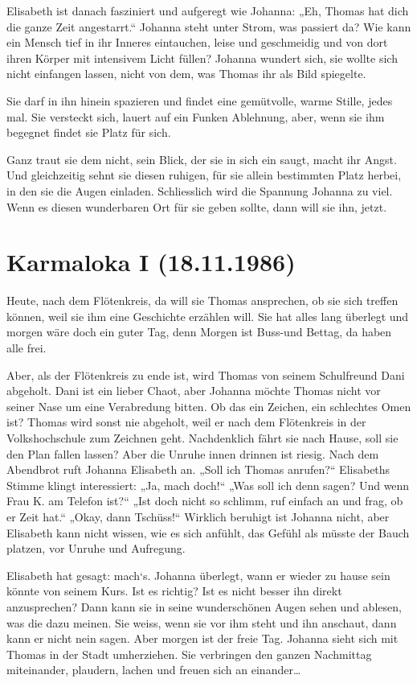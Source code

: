 \documentclass[10pt,titlepage,a5paper]{book}
\begin{document}
Elisabeth ist danach fasziniert und aufgeregt wie Johanna: „Eh, Thomas hat dich die ganze Zeit angestarrt.“ Johanna steht unter Strom, was passiert da? Wie kann ein Mensch tief in ihr Inneres eintauchen, leise und geschmeidig und von dort ihren Körper mit intensivem Licht füllen? Johanna wundert sich, sie wollte sich nicht einfangen lassen, nicht von dem, was Thomas ihr als Bild spiegelte. 

Sie darf in ihn hinein spazieren und findet eine gemütvolle, warme Stille, jedes mal. Sie versteckt sich, lauert auf ein Funken Ablehnung, aber, wenn sie ihm begegnet findet sie Platz für sich. 

Ganz traut sie dem nicht, sein Blick, der sie in sich ein saugt, macht ihr Angst. Und gleichzeitig sehnt sie diesen ruhigen, für sie allein bestimmten Platz herbei, in den sie die Augen einladen. Schliesslich wird die Spannung Johanna zu viel. Wenn es diesen wunderbaren Ort für sie geben sollte, dann will sie ihn, jetzt.


\section*{Karmaloka I (18.11.1986)}


Heute, nach dem Flötenkreis, da will sie Thomas ansprechen, ob sie sich treffen können, weil sie ihm eine Geschichte erzählen will. Sie hat alles lang überlegt und morgen wäre doch ein guter Tag, denn Morgen ist Buss-und Bettag, da haben alle frei.

Aber, als der Flötenkreis zu ende ist, wird Thomas von seinem Schulfreund Dani abgeholt. Dani ist ein lieber Chaot, aber Johanna möchte Thomas nicht vor seiner Nase um eine Verabredung bitten. Ob das ein Zeichen, ein schlechtes Omen ist? Thomas wird sonst nie abgeholt, weil er nach dem Flötenkreis in der Volkshochschule zum Zeichnen geht. Nachdenklich fährt sie nach Hause, soll sie den Plan fallen lassen? Aber die Unruhe innen drinnen ist riesig. Nach dem Abendbrot ruft Johanna Elisabeth an. „Soll ich Thomas anrufen?“ Elisabeths Stimme klingt interessiert: „Ja, mach doch!“ „Was soll ich denn sagen? Und wenn Frau K. am Telefon ist?“ „Ist doch nicht so schlimm, ruf einfach an und frag, ob er Zeit hat.“ „Okay, dann Tschüss!“ Wirklich beruhigt ist Johanna nicht, aber Elisabeth kann nicht wissen, wie es sich anfühlt, das Gefühl als müsste der Bauch platzen, vor Unruhe und Aufregung.

Elisabeth hat gesagt: mach`s. Johanna überlegt, wann er wieder zu hause sein könnte von seinem Kurs. Ist es richtig? Ist es nicht besser ihn direkt anzusprechen? Dann kann sie in seine wunderschönen Augen sehen und ablesen, was die dazu meinen. Sie weiss, wenn sie vor ihm steht und ihn anschaut, dann kann er nicht nein sagen. Aber morgen ist der freie Tag. Johanna  sieht sich mit Thomas in der Stadt umherziehen. Sie verbringen den ganzen Nachmittag miteinander, plaudern, lachen und freuen sich an einander\dots 
\end{document}
